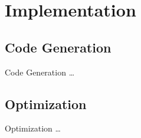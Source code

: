 \section{Implementation}
\subsection{Code Generation}
\begin{frame}{Code Generation}
    \dots
\end{frame}

\subsection{Optimization}
\begin{frame}{Optimization}
    \dots
\end{frame}
